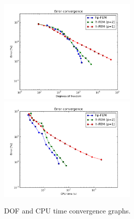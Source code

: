 \begin{figure}[!ht]
\centering
\includegraphics[height=5cm]{nist/nist-9/conv_dof_aniso.png}\ \
\includegraphics[height=5cm]{nist/nist-9/conv_cpu_aniso.png}
\caption{DOF and CPU time convergence graphs.}
\label{fig:nist-9-conv}
\end{figure}

